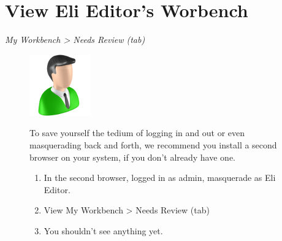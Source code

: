 \documentclass[letterpaper,10pt,english]{sphinxmanual}
\begin{document}
\section{View Eli Editor's Worbench}
\label{moderation:view-eli-editor-s-worbench}
\emph{My Workbench \textgreater{} Needs Review (tab)}
\begin{figure}[htbp]
\centering

\includegraphics{sites/default/files/recipes/user_icons/editor.png}
{\small 
To save yourself the tedium of logging in and out or even masquerading back and forth, we recommend you install a second browser on your system, if you don't already have one.
\begin{enumerate}
\item {} 
In the second browser, logged in as admin, masquerade as Eli Editor.

\item {} 
View My Workbench \textgreater{} Needs Review (tab)

\item {} 
You shouldn't see anything yet.

\end{enumerate}
}\end{figure}
\end{document}
